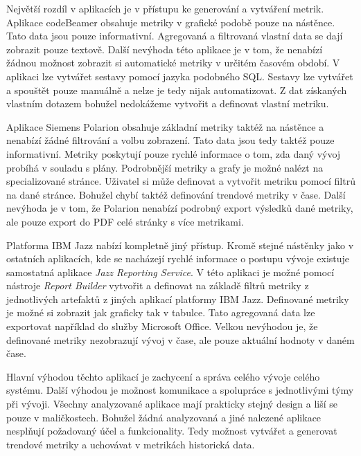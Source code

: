 \documentclass[czech,master,public,dept460,male,cpdeclaration,oneside]{diploma}
\begin{document}
Největší rozdíl v aplikacích je v přístupu ke generování a vytváření metrik. Aplikace codeBeamer obsahuje metriky v grafické podobě pouze na nástěnce. Tato data jsou pouze informativní. Agregovaná a filtrovaná vlastní data se dají zobrazit pouze textově. Další nevýhoda této aplikace je v tom, že nenabízí žádnou možnost zobrazit si automatické metriky v určitém časovém období. V aplikaci lze vytvářet sestavy pomocí jazyka podobného SQL. Sestavy lze vytvářet a spouštět pouze manuálně a nelze je tedy nijak automatizovat. Z dat získaných vlastním dotazem bohužel nedokážeme vytvořit a definovat vlastní metriku. 

Aplikace Siemens Polarion obsahuje základní metriky taktéž na nástěnce a nenabízí žádné filtrování a volbu zobrazení. Tato data jsou tedy taktéž pouze informativní. Metriky poskytují pouze rychlé informace o tom, zda daný vývoj probíhá v souladu s plány. Podrobnější metriky a grafy je možné nalézt na specializované stránce. Uživatel si může definovat a vytvořit metriku pomocí filtrů na dané stránce. Bohužel chybí taktéž definování trendové metriky v čase. Další nevýhoda je v tom, že Polarion nenabízí podrobný export výsledků dané metriky, ale pouze export do PDF celé stránky s více metrikami.

Platforma IBM Jazz nabízí kompletně jiný přístup. Kromě stejné nástěnky jako v ostatních aplikacích, kde se nacházejí rychlé informace o postupu vývoje existuje samostatná aplikace \textit{Jazz Reporting Service}. V této aplikaci je možné pomocí nástroje \textit{Report Builder} vytvořit a definovat na základě filtrů metriky z jednotlivých artefaktů z jiných aplikací platformy IBM Jazz. Definované metriky je možné si zobrazit jak graficky tak v tabulce. Tato agregovaná data lze exportovat například do služby Microsoft Office. Velkou nevýhodou je, že definované metriky nezobrazují vývoj v čase, ale pouze aktuální hodnoty v daném čase. 

Hlavní výhodou těchto aplikací je zachycení a správa celého vývoje celého systému. Další výhodou je možnost komunikace a spolupráce s jednotlivými týmy při vývoji. Všechny analyzované aplikace mají prakticky stejný design a liší se pouze v maličkostech. Bohužel žádná analyzovaná a jiné nalezené aplikace nesplňují požadovaný účel a funkcionality. Tedy možnost vytvářet a generovat trendové metriky a uchovávat v metrikách historická data.
\end{document}
